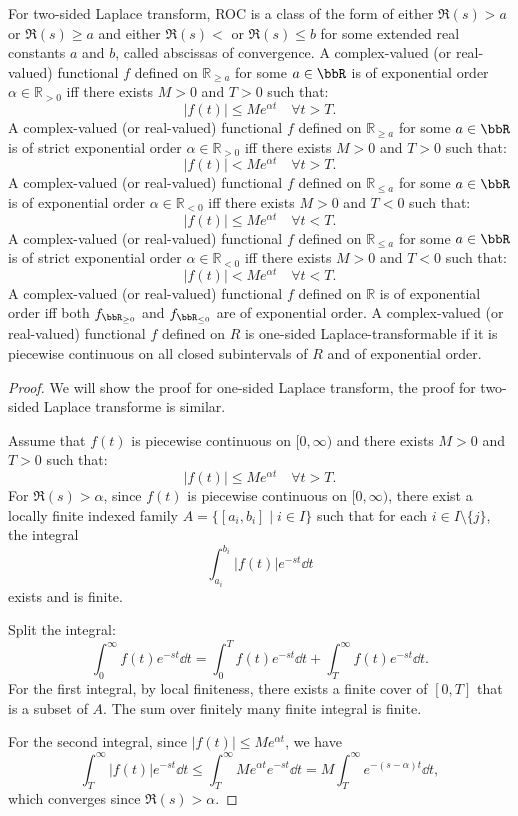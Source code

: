 \documentclass[a4paper,12pt]{article}
\begin{document}
For two-sided Laplace transform, ROC is a class of the form of either $\Re(s) > a$ or $\Re(s) \geq a$ and either $\Re(s) <  $ or $\Re(s) \leq b$ for some extended real constants $a$ and $b$, called abscissas of convergence.
A complex-valued (or real-valued) functional $f$ defined on $\mathbb{R}_{\geq a}$ for some $a\in\bbR$ is of exponential order $\alpha\in\mathbb{R}_{>0}$ iff there exists $M>0$ and $T>0$ such that:
\[|f(t)|\leq Me^{\alpha t}\quad\forall t>T.\]
A complex-valued (or real-valued) functional $f$ defined on $\mathbb{R}_{\geq a}$ for some $a\in\bbR$ is of strict exponential order $\alpha\in\mathbb{R}_{>0}$ iff there exists $M>0$ and $T>0$ such that:
\[|f(t)|<Me^{\alpha t}\quad\forall t>T.\]
A complex-valued (or real-valued) functional $f$ defined on $\mathbb{R}_{\leq a}$ for some $a\in\bbR$ is of exponential order $\alpha\in\mathbb{R}_{<0}$ iff there exists $M>0$ and $T<0$ such that:
\[|f(t)|\leq Me^{\alpha t}\quad\forall t<T.\]
A complex-valued (or real-valued) functional $f$ defined on $\mathbb{R}_{\leq a}$ for some $a\in\bbR$ is of strict exponential order $\alpha\in\mathbb{R}_{<0}$ iff there exists $M>0$ and $T<0$ such that:
\[|f(t)|<Me^{\alpha t}\quad\forall t<T.\]
A complex-valued (or real-valued) functional $f$ defined on $\mathbb{R}$ is of exponential order iff both $f_{\bbR_{\geq0}}$ and $f_{\bbR_{\leq0}}$ are of exponential order.
A complex-valued (or real-valued) functional $f$ defined on $R$ is one-sided Laplace-transformable if it is piecewise continuous on all closed subintervals of $R$ and of exponential order.
\begin{proof}
We will show the proof for one-sided Laplace transform, the proof for two-sided Laplace transforme is similar.

Assume that $f(t)$ is piecewise continuous on $[0,\infty)$ and there exists $M>0$ and $T>0$ such that:
\[|f(t)|\leq Me^{\alpha t}\quad \forall t>T.\]
For $\Re(s)>\alpha$, since $f(t)$ is piecewise continuous on $[0,\infty)$, there exist a locally finite indexed family $A=\{[a_i,b_i]\mid i\in I\}$ such that for each $i\in I\setminus\{j\}$, the integral
\[\int_{a_i}^{b_i} |f(t)| e^{-st}\dd{t}\]
exists and is finite.

Split the integral:
\[\int_0^{\infty}f(t)e^{-st}\dd{t}=\int_0^Tf(t)e^{-st}\dd{t}+\int_T^{\infty}f(t)e^{-st}\dd{t}.\]
For the first integral, by local finiteness, there exists a finite cover of $[0,T]$ that is a subset of $A$. The sum over finitely many finite integral is finite.

For the second integral, since $|f(t)| \le M e^{\alpha t}$, we have
\[\int_T^\infty |f(t)| e^{-st}\dd{t}\le \int_T^\infty M e^{\alpha t} e^{-st}\dd{t} = M \int_T^\infty e^{-(s-\alpha)t}\dd{t},\]
which converges since $\Re(s)>\alpha$.
\end{proof}
\end{document}
